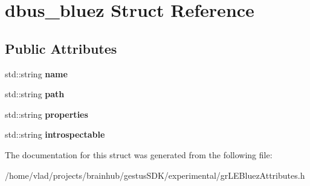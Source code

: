 \hypertarget{structdbus__bluez}{}\section{dbus\+\_\+bluez Struct Reference}
\label{structdbus__bluez}
\subsection*{Public Attributes}
\begin{DoxyCompactItemize}
\item 
\mbox{\label{structdbus__bluez_a53fba2b3c8bbc075353364ad983decb7}} 
std\+::string {\bfseries name}
\item 
\mbox{\label{structdbus__bluez_a06562a13c9877c5bfcb4aa3796f8afdd}} 
std\+::string {\bfseries path}
\item 
\mbox{\label{structdbus__bluez_ac2590c9e985831da2d117cafeb51fa9e}} 
std\+::string {\bfseries properties}
\item 
\mbox{\label{structdbus__bluez_a739d986ed0b243fb486bb78ce1a201fb}} 
std\+::string {\bfseries introspectable}
\end{DoxyCompactItemize}


The documentation for this struct was generated from the following file\+:\begin{DoxyCompactItemize}
\item 
/home/vlad/projects/brainhub/gestus\+S\+D\+K/experimental/gr\+L\+E\+Bluez\+Attributes.\+h\end{DoxyCompactItemize}
